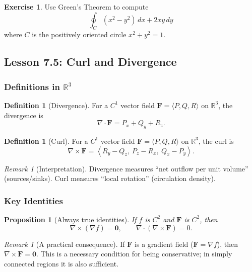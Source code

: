 \documentclass[12pt]{article}
\numberwithin{equation}{section}
\newcommand{\RR}{\mathbb{R}}
\newcommand{\vect}[1]{\boldsymbol{#1}}   %
\theoremstyle{plain}
\newtheorem{proposition}[theorem]{Proposition}
\theoremstyle{definition}
\newtheorem{definition}[theorem]{Definition}
\newtheorem{exercise}[theorem]{Exercise}
\theoremstyle{remark}
\newtheorem{remark}[theorem]{Remark}
\begin{document}
\begin{exercise}
Use Green's Theorem to compute
\[
\oint_C (x^2-y^2)\,dx + 2xy\,dy
\]
where $C$ is the positively oriented circle $x^2+y^2=1$.
\end{exercise}

\subsection{Lesson 7.5: Curl and Divergence}

\subsubsection{Definitions in $\RR^3$}

\begin{definition}[Divergence]\label{def:div}
For a $C^1$ vector field $\vect F=\langle P,Q,R\rangle$ on $\RR^3$, the divergence is
\[
\nabla\cdot \vect F = P_x+Q_y+R_z.
\]
\end{definition}

\begin{definition}[Curl]\label{def:curl}
For a $C^1$ vector field $\vect F=\langle P,Q,R\rangle$ on $\RR^3$, the curl is
\[
\nabla\times \vect F
=
\left\langle
R_y-Q_z,\ 
P_z-R_x,\ 
Q_x-P_y
\right\rangle.
\]
\end{definition}

\begin{remark}[Interpretation]
Divergence measures “net outflow per unit volume” (sources/sinks).  
Curl measures “local rotation” (circulation density).
\end{remark}

\subsubsection{Key Identities}

\begin{proposition}[Always true identities]\label{prop:identities}
If $f$ is $C^2$ and $\vect F$ is $C^2$, then
\[
\nabla\times(\nabla f)=\vect 0,
\qquad
\nabla\cdot(\nabla\times \vect F)=0.
\]
\end{proposition}

\begin{remark}[A practical consequence]
If $\vect F$ is a gradient field ($\vect F=\nabla f$), then $\nabla\times \vect F=\vect 0$.  
This is a necessary condition for being conservative; in simply connected regions it is also sufficient.
\end{remark}
\end{document}
